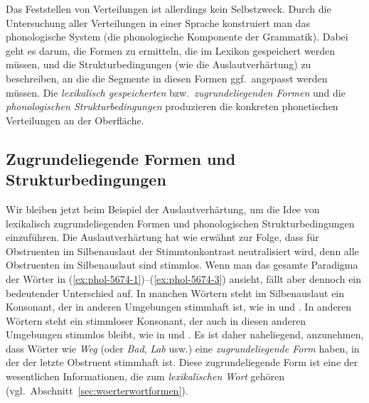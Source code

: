 Das Feststellen von Verteilungen ist allerdings kein Selbstzweck.
Durch die Untersuchung aller Verteilungen in einer Sprache konstruiert man das phonologische System (die phonologische Komponente der Grammatik).
Dabei geht es darum, die Formen zu ermitteln, die im Lexikon gespeichert werden müssen, und die Strukturbedingungen (wie die Auslautverhärtung) zu beschreiben, an die die Segmente in diesen Formen ggf.\ angepasst werden müssen.
Die \textit{lexikalisch gespeicherten} bzw.\ \textit{zugrundeliegenden Formen} und die \textit{phonologischen Strukturbedingungen} produzieren die konkreten phonetischen Verteilungen an der Oberfläche.

\subsection{Zugrundeliegende Formen und Strukturbedingungen}

\label{sec:zugrundeliegendeformenstrukturbedingungen}

Wir bleiben jetzt beim Beispiel der Auslautverhärtung, um die Idee von lexikalisch zugrundeliegenden Formen und phonologischen Strukturbedingungen einzuführen.
Die Auslautverhärtung hat wie erwähnt zur Folge, dass für Obstruenten im Silbenauslaut der Stimmtonkontrast neutralisiert wird, denn alle Obstruenten im Silbenauslaut sind stimmlos.
Wenn man das gesamte Paradigma der Wörter in (\ref{ex:phol-5674-1})--(\ref{ex:phol-5674-3}) ansieht, fällt aber dennoch ein bedeutender Unterschied auf.
In manchen Wörtern steht im Silbenauslaut ein Konsonant, der in anderen Umgebungen stimmhaft ist, wie in \textipa{[ve:k]} und \textipa{[ve:g@s]}.
In anderen Wörtern steht ein stimmloser Konsonant, der auch in diesen anderen Umgebungen stimmlos bleibt, wie in \textipa{[bOk]} und \textipa{[bOk@s]}.
Es ist daher naheliegend, anzunehmen, dass Wörter wie \textit{Weg} (oder \textit{Bad}, \textit{Lab} usw.) eine \textit{zugrundeliegende Form} haben, in der der letzte Obstruent stimmhaft ist.
Diese zugrundeliegende Form ist eine der wesentlichen Informationen, die zum \textit{lexikalischen Wort} gehören (vgl.\ Abschnitt~\ref{sec:woerterwortformen}).

